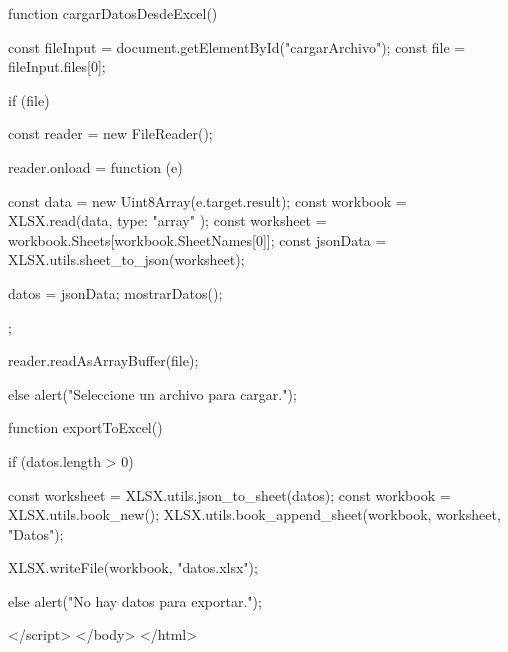         function cargarDatosDesdeExcel() {
            const fileInput = document.getElementById("cargarArchivo");
            const file = fileInput.files[0];

            if (file) {
                const reader = new FileReader();

                reader.onload = function (e) {
                    const data = new Uint8Array(e.target.result);
                    const workbook = XLSX.read(data, { type: "array" });
                    const worksheet = workbook.Sheets[workbook.SheetNames[0]];
                    const jsonData = XLSX.utils.sheet_to_json(worksheet);

                    datos = jsonData;
                    mostrarDatos();
                };

                reader.readAsArrayBuffer(file);
            } else {
                alert("Seleccione un archivo para cargar.");
            }
        }

        function exportToExcel() {
            if (datos.length > 0) {
                const worksheet = XLSX.utils.json_to_sheet(datos);
                const workbook = XLSX.utils.book_new();
                XLSX.utils.book_append_sheet(workbook, worksheet, "Datos");

                XLSX.writeFile(workbook, "datos.xlsx");
            } else {
                alert("No hay datos para exportar.");
            }
        }
    </script>
</body>
</html>





